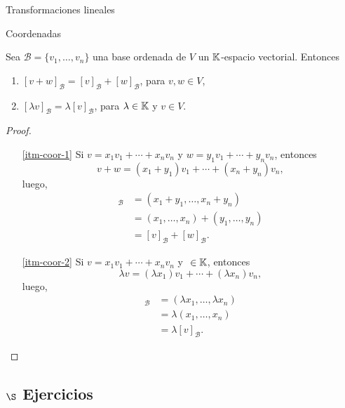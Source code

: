\begin{chapter}{Transformaciones lineales}
\begin{section}{Coordenadas}
    \begin{proposicion}\label{vectorbase->lineal}
        Sea $\mathcal{B}=\{v_1,\ldots,v_n\}$ una base ordenada de $V$ un $\mathbb K$-espacio vectorial. Entonces
        \begin{enumerate}
            \item\label{itm-coor-1} $[v + w]_\mathcal{B} = [v]_\mathcal{B} +[w]_\mathcal{B}$, para $v,w \in V$,
            \item\label{itm-coor-2} $[\lambda v]_\mathcal{B} = \lambda[v]_\mathcal{B}$, para $\lambda \in \mathbb K$ y $v \in V$.
        \end{enumerate}
    \end{proposicion} 
    \begin{proof}${}^{}$
        \begin{enumerate}
            \item[\ref{itm-coor-1}] Si $v = x_1v_1 + \cdots +x_nv_n$ y $w = y_1v_1 + \cdots +y_nv_n$, entonces 
            $$
            v + w = (x_1+y_1)v_1 + \cdots +(x_n+y_n)v_n,
            $$
            luego,
            \begin{align*}
                [v + w]_\mathcal{B} &=(x_1+y_1,\ldots ,x_n+y_n) \\
                &= (x_1,\ldots, x_n) +(y_1,\ldots , y_n) \\
                &= [v]_\mathcal{B} +[w]_\mathcal{B}.
            \end{align*}
                    
            \item[\ref{itm-coor-2}] Si $v = x_1v_1 + \cdots +x_nv_n$ y $\ \in \mathbb K$, entonces 
            $$
            \lambda v = (\lambda x_1)v_1 + \cdots +(\lambda x_n)v_n,
            $$
            luego,
            \begin{align*}
                [\lambda v ]_\mathcal{B} &= (\lambda x_1,\ldots , \lambda x_n )\\
            &= \lambda (x_1,\ldots ,x_n) \\
            &= \lambda [v]_\mathcal{B}.
            \end{align*}
        \end{enumerate}
    \end{proof}
    
    \subsection*{$\S$ Ejercicios}

    
    \end{section}



\end{chapter}
